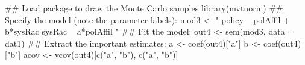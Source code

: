 \begin{Schunk}
\begin{Sinput}
 ## Load package to draw the Monte Carlo samples
 library(mvtnorm) 
 ## Specify the model (note the parameter labels):
 mod3 <- "
 policy ~ polAffil + b*sysRac
 sysRac ~ a*polAffil
 "
 ## Fit the model:
 out4 <- sem(mod3, data = dat1)
 ## Extract the important estimates:
 a <- coef(out4)["a"]
 b <- coef(out4)["b"]
 acov <- vcov(out4)[c("a", "b"), c("a", "b")]
\end{Sinput}
\end{Schunk}
